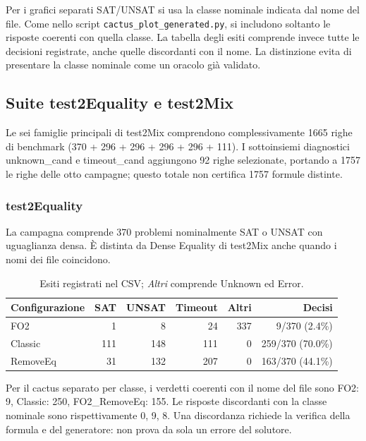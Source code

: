 Per i grafici separati SAT/UNSAT si usa la classe nominale indicata dal nome del file. Come nello script \texttt{cactus\_plot\_generated.py}, si includono soltanto le risposte coerenti con quella classe. La tabella degli esiti comprende invece tutte le decisioni registrate, anche quelle discordanti con il nome. La distinzione evita di presentare la classe nominale come un oracolo già validato.
\subsection{Suite test2Equality e test2Mix}


Le sei famiglie principali di test2Mix comprendono complessivamente 1665 righe di benchmark (370 + 296 + 296 + 296 + 296 + 111). I sottoinsiemi diagnostici unknown\_cand e timeout\_cand aggiungono 92 righe selezionate, portando a 1757 le righe delle otto campagne; questo totale non certifica 1757 formule distinte.


\subsubsection{test2Equality}

La campagna comprende 370 problemi nominalmente SAT o UNSAT con uguaglianza densa. È distinta da Dense Equality di test2Mix anche quando i nomi dei file coincidono.

\begin{table}[H]
\centering
\small
\begin{tabular}{lrrrrr}
\toprule
Configurazione & SAT & UNSAT & Timeout & Altri & Decisi \\
\midrule

FO2 & 1 & 8 & 24 & 337 & 9/370 (2.4\%) \\

Classic & 111 & 148 & 111 & 0 & 259/370 (70.0\%) \\

RemoveEq & 31 & 132 & 207 & 0 & 163/370 (44.1\%) \\

\bottomrule
\end{tabular}
\caption{Esiti registrati nel CSV; \textit{Altri} comprende Unknown ed Error.}
\end{table}

Per il cactus separato per classe, i verdetti coerenti con il nome del file sono FO2: 9, Classic: 250, FO2\_RemoveEq: 155. Le risposte discordanti con la classe nominale sono rispettivamente 0, 9, 8. Una discordanza richiede la verifica della formula e del generatore: non prova da sola un errore del solutore.

